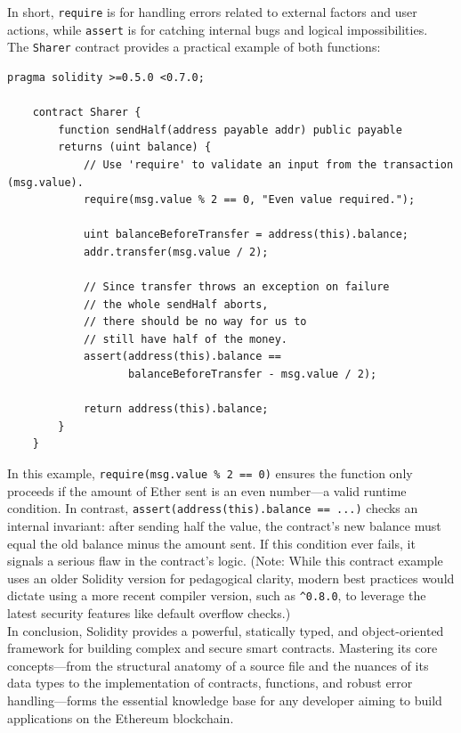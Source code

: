 \documentclass{scrbook}
\begin{document}
In short, \texttt{require} is for handling errors related to external factors and user actions, while \texttt{assert} is for catching internal bugs and logical impossibilities.\\

The \texttt{Sharer} contract provides a practical example of both functions:

\begin{lstlisting}[caption={Sharer contract}]
    pragma solidity >=0.5.0 <0.7.0;
    
    contract Sharer {
        function sendHalf(address payable addr) public payable
        returns (uint balance) {
            // Use 'require' to validate an input from the transaction (msg.value).
            require(msg.value % 2 == 0, "Even value required.");
    
            uint balanceBeforeTransfer = address(this).balance;
            addr.transfer(msg.value / 2);
    
            // Since transfer throws an exception on failure
            // the whole sendHalf aborts,
            // there should be no way for us to
            // still have half of the money.
            assert(address(this).balance ==
                   balanceBeforeTransfer - msg.value / 2);
    
            return address(this).balance;
        }
    }
\end{lstlisting}

In this example, \texttt{require(msg.value \% 2 == 0)} ensures the function only proceeds if the amount of Ether sent is an even number—a valid runtime condition. \hfill \break
In contrast, \texttt{assert(address(this).balance == ...)} checks an internal invariant: after sending half the value, the contract's new balance must equal the old balance minus the amount sent. If this condition ever fails, it signals a serious flaw in the contract's logic. (Note: While this contract example uses an older Solidity version for pedagogical clarity, modern best practices would dictate using a more recent compiler version, such as \texttt{\textasciicircum0.8.0}, to leverage the latest security features like default overflow checks.)\\

In conclusion, Solidity provides a powerful, statically typed, and object-oriented framework for building complex and secure smart contracts. Mastering its core concepts—from the structural anatomy of a source file and the nuances of its data types to the implementation of contracts, functions, and robust error handling—forms the essential knowledge base for any developer aiming to build applications on the Ethereum blockchain.
\end{document}
